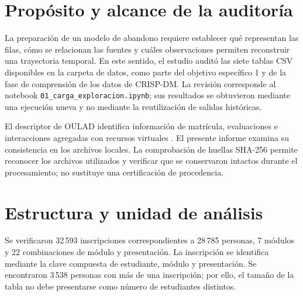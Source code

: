\section{Propósito y alcance de la auditoría}
La preparación de un modelo de abandono requiere establecer qué representan las
filas, cómo se relacionan las fuentes y cuáles observaciones permiten reconstruir
una trayectoria temporal. En este sentido, el estudio auditó las siete tablas CSV
disponibles en la carpeta de datos, como parte del objetivo específico 1 y de la fase
de comprensión de los datos de CRISP-DM. La revisión corresponde al notebook
\texttt{01\_carga\_exploracion.ipynb}; sus resultados se obtuvieron mediante una
ejecución nueva y no mediante la reutilización de salidas históricas.

El descriptor de OULAD identifica información de matrícula, evaluaciones e
interacciones agregadas con recursos virtuales \cite{sdata2017171}. El presente
informe examina su consistencia en los archivos locales. La comprobación de huellas
SHA-256 permite reconocer los archivos utilizados y verificar que se conservaron
intactos durante el procesamiento; no sustituye una certificación de procedencia.

\section{Estructura y unidad de análisis}
Se verificaron 32\,593 inscripciones correspondientes a 28\,785 personas, 7 módulos y 22 combinaciones de módulo y presentación. La inscripción se identifica mediante la clave compuesta de estudiante, módulo y presentación. Se encontraron 3\,538 personas con más de una inscripción; por ello, el tamaño de la tabla no debe presentarse como número de estudiantes distintos.

